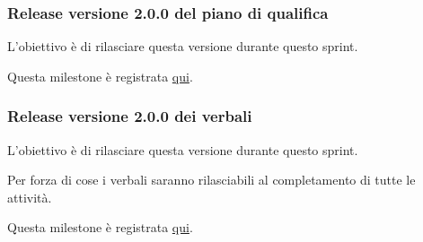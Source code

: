 \subsubsection{Release versione 2.0.0 del piano di qualifica}

L'obiettivo è di rilasciare questa versione durante questo sprint.

Questa milestone è registrata \href{https://github.com/SWEasabi/piano-di-qualifica/milestone/3}{qui}.

\subsubsection{Release versione 2.0.0 dei verbali}

L'obiettivo è di rilasciare questa versione durante questo sprint.

Per forza di cose i verbali saranno rilasciabili al completamento di tutte le attività.

Questa milestone è registrata \href{https://github.com/SWEasabi/verbali/milestone/1}{qui}.
